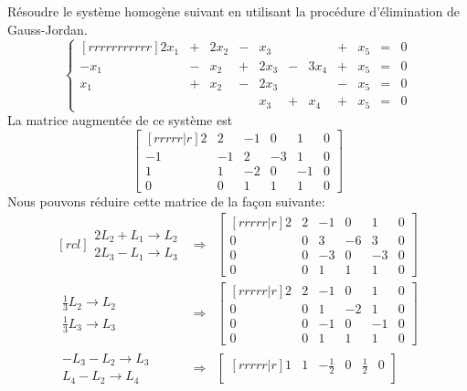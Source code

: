 \begin{exemple}
	Résoudre le système homogène suivant en utilisant la procédure d'élimination de Gauss-Jordan.
	\[
	\left\{
	\begin{matrix}[rrrrrrrrrrr]
	2x_1 &+& 2x_2 &-&x_3 && &+& x_5 &=& 0 \\
	-x_1 &-& x_2 &+& 2x_3 &-& 3x_4 &+& x_5 &=& 0\\
	x_1 &+& x_2 &-& 2x_3 &&&-&x_5 &=& 0\\
	&&&&x_3 &+& x_4&+&x_5&=&0
	\end{matrix}
	\right.
	\]
	\solution
	La matrice augmentée de ce système est
	\[
	\begin{bmatrix}[rrrrr|r]
	2 & 2 &-1&0&1&0\\
	-1&-1&2&-3&1&0\\
	1&1&-2&0&-1&0\\
	0&0&1&1&1&0
	\end{bmatrix}
	\]
	Nous pouvons réduire cette matrice de la façon suivante:
	\[
	\begin{matrix}[rcl]
		\begin{matrix}
		2L_2 + L_1 \rightarrow L_2 \\[5pt]
		2L_3 - L_1 \rightarrow L_3
		\end{matrix}
		&\Longrightarrow&
		\begin{bmatrix}[rrrrr|r]
		2 & 2 &-1&0&1&0\\
		0&0&3&-6&3&0\\
		0&0&-3&0&-3&0\\
		0&0&1&1&1&0
		\end{bmatrix}
	\\[20pt]
		\begin{matrix}
		\frac{1}{3}L_2 \rightarrow L_2 \\[5pt]
		\frac{1}{3}L_3 \rightarrow L_3
		\end{matrix}
		&\Longrightarrow&
		\begin{bmatrix}[rrrrr|r]
		2 & 2 &-1&0&1&0\\
		0&0&1&-2&1&0\\
		0&0&-1&0&-1&0\\
		0&0&1&1&1&0
		\end{bmatrix}
	\\[20pt]
		\begin{matrix}
		-L_3 - L_2 \rightarrow L_3 \\[5pt]
		L_4 - L_2 \rightarrow L_4
		\end{matrix}
		&\Longrightarrow&
		\begin{bmatrix}[rrrrr|r]
		1 & 1 &-\frac{1}{2}&0&\frac{1}{2}&0\\

\end{bmatrix}
\end{matrix}\]
\end{exemple}

